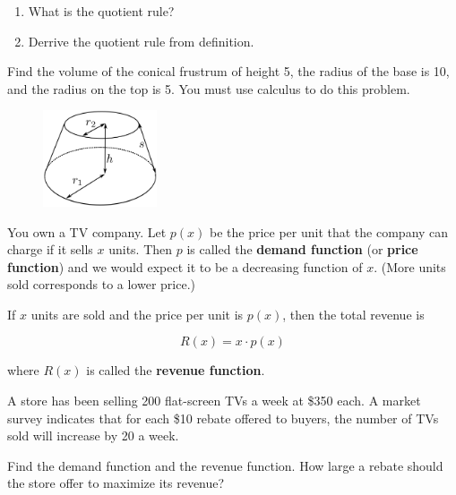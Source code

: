 \documentclass[12pt]{amsart}
\begin{document}
\newpage

\begin{problem}[20 points]
\begin{enumerate}
	\item What is the quotient rule?
	      \vspace{5cm}
	\item Derrive the quotient rule from definition.
\end{enumerate}
\end{problem}

\newpage

\begin{problem}[20 points]
Find the volume of the conical frustrum of height 5, the radius of the base is 10,
and the radius on the top is 5.
You must use calculus to do this problem.
\begin{figure}[ht]
	\begin{center}
		\includegraphics[width=0.3\textwidth]{CroppedCone.svg.png}
	\end{center}
\end{figure}


\end{problem}

\newpage

\begin{problem}[20 points]
You own a TV company.
Let \( p(x) \) be the price per unit that the company can charge if it sells \( x \) units. Then \( p \) is called the \textbf{demand function} (or \textbf{price function}) and we would expect it to be a decreasing function of \( x \). (More units sold corresponds to a lower price.)

If \( x \) units are sold and the price per unit is \( p(x) \), then the total revenue is

\[
	R(x) = x \cdot p(x)
\]

where \( R(x) \) is called the \textbf{revenue function}.

A store has been selling 200 flat-screen TVs a week at \$350 each. A market survey indicates that for each \$10 rebate offered to buyers, the number of TVs sold will increase by 20 a week.

Find the demand function and the revenue function. How large a rebate should the store offer to maximize its revenue?

\end{problem}
\end{document}
